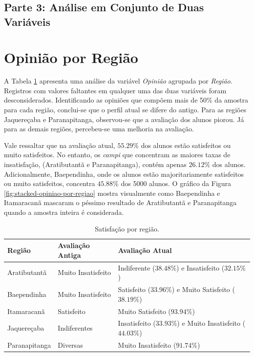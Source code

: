 \documentclass[10pt,a4paper,oneside]{article}
\newcommand{\arat}{Aratibutantã\xspace}
\newcommand{\baep}{Baependinha\xspace}
\newcommand{\itam}{Itamaracanã\xspace}
\newcommand{\jaqu}{Jaquereçaba\xspace}
\newcommand{\para}{Paranapitanga\xspace}
\begin{document}
\FloatBarrier
\clearpage
\begin{center}
\section*{Parte 3: Análise em Conjunto de Duas Variáveis}
\end{center}

\section{Opinião por Região}
\label{section:opiniao-regiao}

A Tabela \ref{table:satisfacao-regiao} apresenta uma análise da variável \textit{Opinião} agrupada por \textit{Região}. Registros com valores faltantes em qualquer uma das duas variáveis foram desconsiderados. Identificando as opiniões que compõem mais de 50\% da amostra para cada região, conclui-se que o perfil atual se difere do antigo. Para as regiões \jaqu e \para, observou-se que a avaliação dos alunos piorou. Já para as demais regiões, percebeu-se uma melhoria na avaliação. 

Vale ressaltar que na avaliação atual, $55.29\%$ dos alunos estão satisfeitos ou muito satisfeitos. No entanto, os \textit{campi} que concentram as maiores taxas de insatisfação, (\arat e \para), contém apenas $26.12\%$ dos alunos. Adicionalmente, \baep, onde os alunos estão majoritariamente satisfeitos ou muito satisfeitos, concentra $45.88\%$ dos 5000 alunos. O gráfico da Figura \ref{fig:stacked-opiniao-por-regiao} mostra visualmente como \baep e \itam mascaram o péssimo resultado de \arat e \para quando a amostra inteira é considerada.

\begin{table}[!h]
	\footnotesize
	\centering
	\caption{Satisfação por região.}
	\vspace{0.5em}
	\label{table:satisfacao-regiao}
	\begin{tabular}{l l l}
		\toprule
		\textbf{Região} & \textbf{Avaliação Antiga} & \textbf{Avaliação Atual}                \\
		\midrule
		\arat  & Muito Insatisfeito & Indiferente ($38.48\%$) e Insatisfeito ($32.15\%$)      \\
		\baep  & Muito Insatisfeito & Satisfeito ($33.96\%$) e Muito Satisfeito ($38.19\%$)   \\
		\itam  & Satisfeito         & Muito Satisfeito ($93.94\%$)                            \\
		\jaqu  & Indiferentes       & Insatisfeito ($33.93\%$) e Muito Insatisfeito ($44.03\%$) \\
		\para  & Diversas           & Muito Insatisfeito ($91.74\%$)                          \\
		\bottomrule
	\end{tabular}
\end{table}
\end{document}
